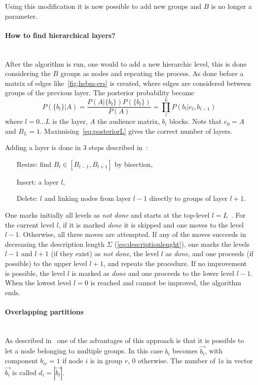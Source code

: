 Using this modification it is now possible to add new groups and $B$ is no longer a parameter.

\paragraph{How to find hierarchical layers?}\mbox{}\\
After the algorithm is run, one would to add a new hierarchic level, this is done considering the $B$ groups as nodes and repeating the process.
As done before a matrix of edges like~\ref{fig:hsbm-ers} is created, where edges are considered between groups of the previous layer.
The posterior probability became
\begin{equation}\label{eq:posteriorL}
  P(\{b_l\}|A)=\frac{P(A|\{b_l\})P(\{b_l\})}{P(A)}=\prod_l^L P(b_l|e_l,b_{l-1})
\end{equation}
where $l=0\dots L$ is the layer, $A$ the audience matrix, $b_i$ blocks. Note that $e_0=A$ and $B_L=1$.
Maximising~\ref{eq:posteriorL} gives the correct number of layers.

Adding a layer is done in 3 steps described in~\cite{peixoto2014hierarchic}:
\begin{itemize}
  \item[Resize:] find $B_l\in[B_{l-1},B_{l+1}]$ by bisection,
  \item[Insert:] a layer $l$,
  \item[Delete:] $l$ and linking nodes from layer $l-1$ directly to groups of layer
  $l+1$.
\end{itemize}
One marks initially all levels as \textit{not done} and starts at the top-level $l = L$~\cite{peixoto2014hierarchic}.
For the current level $l$, if it is marked \textit{done} it is skipped and one moves to the level $l-1$. Otherwise, all three moves are attempted. If any of the moves succeeds in decreasing the description length $\Sigma$ (\ref{eq:descriptionlenght}), one marks the levels $l-1$ and $l+1$ (if they exist) as \textit{not done}, the level $l$ as \textit{done}, and one proceeds (if possible) to the upper level $l+1$, and repeats the procedure. If no improvement is possible, the level $l$ is marked as \textit{done} and one proceeds to the lower level $l-1$. When the lowest level $l=0$ is reached and cannot be improved, the algorithm ends.

\paragraph{Overlapping partitions}\mbox{}\\
As described in~\cite{peixoto2015model} one of the advantages of this approach is that it is possible to let a node belonging to multiple groups.
In this case $b_i$ becomes $\vec{b_i}$, with component $b_{ir}=1$ if node $i$ is in group $r$, $0$ otherwise. The number of $1$s in vector $\vec{b_i}$ is called
$d_i=|\vec{b_i}|$.

